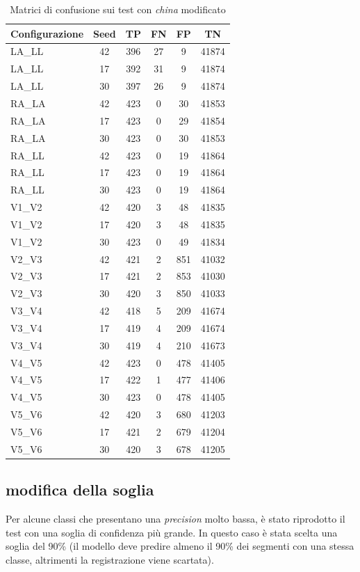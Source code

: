 \begin{table}[htbp]
	\centering
	\caption{Matrici di confusione sui test con \emph{china} modificato}
	\label{tab:china_mod_confusione}
	
	\begin{tabular}{l c c c c c}
		\toprule
		Configurazione & Seed & TP & FN & FP & TN \\
		\midrule

		LA\_LL & 42 & 396 & 27 & 9 & 41874 \\
		LA\_LL & 17 & 392 & 31 & 9 & 41874 \\
		LA\_LL & 30 & 397 & 26 & 9 & 41874 \\
		RA\_LA & 42 & 423 & 0 & 30 & 41853 \\
		RA\_LA & 17 & 423 & 0 & 29 & 41854 \\
		RA\_LA & 30 & 423 & 0 & 30 & 41853 \\
		RA\_LL & 42 & 423 & 0 & 19 & 41864 \\
		RA\_LL & 17 & 423 & 0 & 19 & 41864 \\
		RA\_LL & 30 & 423 & 0 & 19 & 41864 \\
		V1\_V2 & 42 & 420 & 3 & 48 & 41835 \\
		V1\_V2 & 17 & 420 & 3 & 48 & 41835 \\
		V1\_V2 & 30 & 423 & 0 & 49 & 41834 \\
		V2\_V3 & 42 & 421 & 2 & 851 & 41032 \\
		V2\_V3 & 17 & 421 & 2 & 853 & 41030 \\
		V2\_V3 & 30 & 420 & 3 & 850 & 41033 \\
		V3\_V4 & 42 & 418 & 5 & 209 & 41674 \\
		V3\_V4 & 17 & 419 & 4 & 209 & 41674 \\
		V3\_V4 & 30 & 419 & 4 & 210 & 41673 \\
		V4\_V5 & 42 & 423 & 0 & 478 & 41405 \\
		V4\_V5 & 17 & 422 & 1 & 477 & 41406 \\
		V4\_V5 & 30 & 423 & 0 & 478 & 41405 \\
		V5\_V6 & 42 & 420 & 3 & 680 & 41203 \\
		V5\_V6 & 17 & 421 & 2 & 679 & 41204 \\
		V5\_V6 & 30 & 420 & 3 & 678 & 41205 \\
		\bottomrule
	\end{tabular}
\end{table}

\subsection{modifica della soglia}
Per alcune classi che presentano una \emph{precision} molto bassa, è stato riprodotto il test con una soglia di confidenza più grande. In questo caso è stata scelta una soglia del 90\% (il modello deve predire almeno il 90\% dei segmenti con una stessa classe, altrimenti la registrazione viene scartata).

